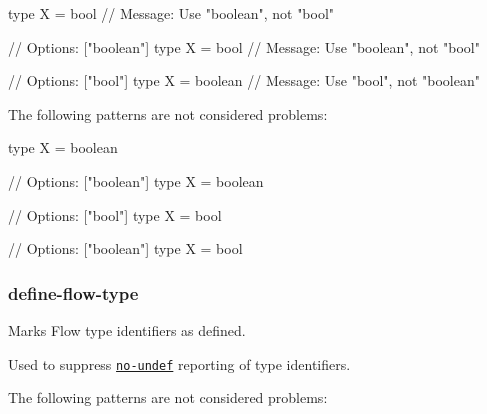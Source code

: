 \begin{DoxyCode}
type X = bool
// Message: Use "boolean", not "bool"

// Options: ["boolean"]
type X = bool
// Message: Use "boolean", not "bool"

// Options: ["bool"]
type X = boolean
// Message: Use "bool", not "boolean"
\end{DoxyCode}


The following patterns are not considered problems\+:


\begin{DoxyCode}
type X = boolean

// Options: ["boolean"]
type X = boolean

// Options: ["bool"]
type X = bool

// Options: ["boolean"]
type X = bool
\end{DoxyCode}


\label{_eslint-plugin-flowtype-rules-define-flow-type}%
 \subsubsection*{{\ttfamily define-\/flow-\/type}}

Marks Flow type identifiers as defined.

Used to suppress \href{http://eslint.org/docs/rules/no-undef}{\tt {\ttfamily no-\/undef}} reporting of type identifiers.

The following patterns are not considered problems\+:


